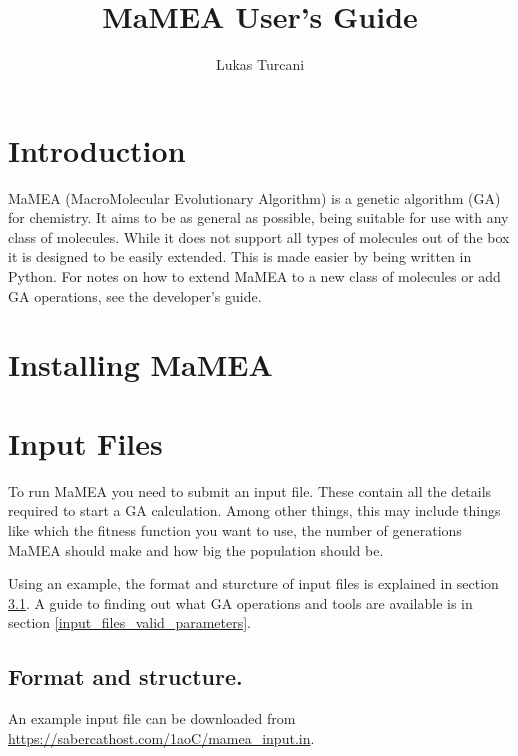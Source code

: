 \documentclass{article}
\title{MaMEA User's Guide}
\author{Lukas Turcani}
\begin{document}
\begin{titlepage}
	\maketitle
\end{titlepage}

\tableofcontents
\newpage
\section{Introduction}
MaMEA (MacroMolecular Evolutionary Algorithm) is a genetic algorithm (GA) for chemistry. It aims to be as general as possible, being suitable for use with any class of molecules. While it does not support all types of molecules out of the box it is designed to be easily extended. This is made easier by being written in Python. For notes on how to extend MaMEA to a new class of molecules or add GA operations, see the developer's guide.

\section{Installing MaMEA}

\section{Input Files}

To run MaMEA you need to submit an input file. These contain all the details required to start a GA calculation. Among other things, this may include things like which the fitness function you want to use, the number of generations MaMEA should make and how big the population should be.

Using an example, the format and sturcture of input files is explained in section \ref{input_files_format_and_structure}. A guide to finding out what GA operations and tools are available is in section \ref{input_files_valid_parameters}.

\subsection{Format and structure.}
\label{input_files_format_and_structure}

An example input file can be downloaded from \url{https://sabercathost.com/1aoC/mamea_input.in}.
\end{document}
